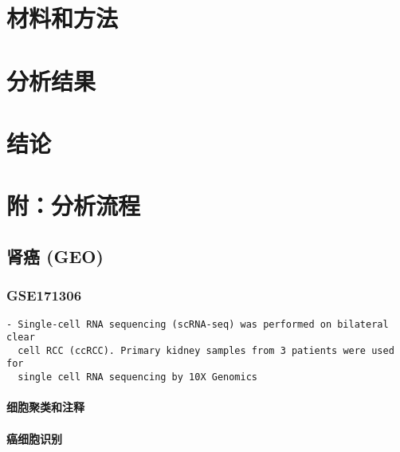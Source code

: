 \documentclass[
]{article}
\begin{document}
\hypertarget{methods}{%
\section{材料和方法}\label{methods}}

\hypertarget{results}{%
\section{分析结果}\label{results}}

\hypertarget{dis}{%
\section{结论}\label{dis}}

\hypertarget{ux9644ux5206ux6790ux6d41ux7a0b}{%
\section{附：分析流程}\label{ux9644ux5206ux6790ux6d41ux7a0b}}

\hypertarget{ux80beux764c-geo}{%
\subsection{肾癌 (GEO)}\label{ux80beux764c-geo}}

\hypertarget{gse171306}{%
\subsubsection{GSE171306}\label{gse171306}}

\begin{verbatim}
- Single-cell RNA sequencing (scRNA-seq) was performed on bilateral clear
  cell RCC (ccRCC). Primary kidney samples from 3 patients were used for
  single cell RNA sequencing by 10X Genomics
\end{verbatim}

\hypertarget{ux7ec6ux80deux805aux7c7bux548cux6ce8ux91ca}{%
\paragraph{细胞聚类和注释}\label{ux7ec6ux80deux805aux7c7bux548cux6ce8ux91ca}}

\hypertarget{ux764cux7ec6ux80deux8bc6ux522b}{%
\paragraph{癌细胞识别}\label{ux764cux7ec6ux80deux8bc6ux522b}}
\end{document}
